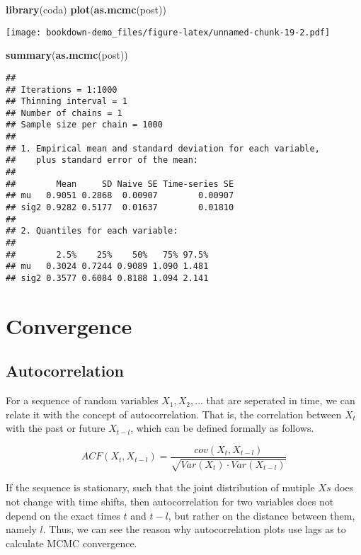 \documentclass[]{book}
\newenvironment{Shaded}{\begin{snugshade}}{\end{snugshade}}
\newcommand{\KeywordTok}[1]{\textcolor[rgb]{0.13,0.29,0.53}{\textbf{#1}}}
\newcommand{\NormalTok}[1]{#1}
\begin{document}
\begin{Shaded}
\begin{Highlighting}[]
\KeywordTok{library}\NormalTok{(coda)}
\KeywordTok{plot}\NormalTok{(}\KeywordTok{as.mcmc}\NormalTok{(post))}
\end{Highlighting}
\end{Shaded}

\texttt{[image: bookdown-demo\_files/figure-latex/unnamed-chunk-19-2.pdf]}

\begin{Shaded}
\begin{Highlighting}[]
\KeywordTok{summary}\NormalTok{(}\KeywordTok{as.mcmc}\NormalTok{(post))}
\end{Highlighting}
\end{Shaded}

\begin{verbatim}
## 
## Iterations = 1:1000
## Thinning interval = 1 
## Number of chains = 1 
## Sample size per chain = 1000 
## 
## 1. Empirical mean and standard deviation for each variable,
##    plus standard error of the mean:
## 
##        Mean     SD Naive SE Time-series SE
## mu   0.9051 0.2868  0.00907        0.00907
## sig2 0.9282 0.5177  0.01637        0.01810
## 
## 2. Quantiles for each variable:
## 
##        2.5%    25%    50%   75% 97.5%
## mu   0.3024 0.7244 0.9089 1.090 1.481
## sig2 0.3577 0.6084 0.8188 1.094 2.141
\end{verbatim}

\section{Convergence}\label{convergence}

\subsection{Autocorrelation}\label{autocorrelation}

For a sequence of random variables \(X_1,X_2,...\) that are seperated in
time, we can relate it with the concept of autocorrelation. That is, the
correlation between \(X_t\) with the past or future \(X_{t-l}\), which
can be defined formally as follows.

\[ACF(X_t,X_{t-l})=\frac{cov(X_t,X_{t-l})}{\sqrt{Var(X_t) \cdot Var(X_{t-l})}}\]

If the sequence is stationary, such that the joint distribution of
mutiple \(Xs\) does not change with time shifts, then autocorrelation
for two variables does not depend on the exact times \(t\) and \(t-l\),
but rather on the distance between them, namely \(l\). Thus, we can see
the reason why autocorrelation plots use lags as to calculate MCMC
convergence.
\end{document}
